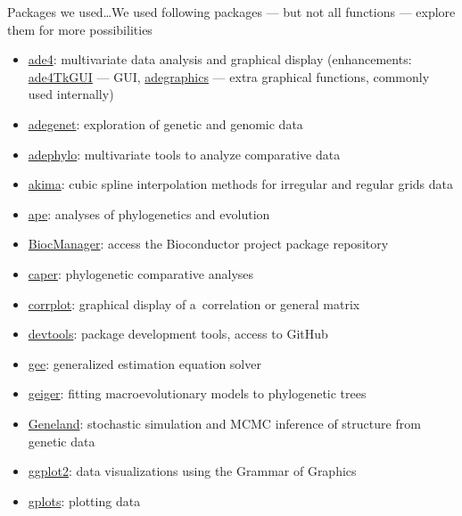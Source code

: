 \documentclass[compress, ucs, xelatex, 11pt, xcolor=svgnames,
	hyperref={
		bookmarks=true,
		unicode=true,
		colorlinks=true,
		pdftitle={Molecular data in R},
		plainpages=false,
		pdfauthor={Vojtech Zeisek},
		pdfsubject={Course about phylogeny and evolution in R},
		pdfcreator={XeLaTeX},
		pdfkeywords={R, evolution, phylogeny, molecular data},
		linkcolor=Tomato,
		anchorcolor=SaddleBrown,
		citecolor=Goldenrod,
		filecolor=DarkMagenta,
		menucolor=Sienna,
		urlcolor=DarkTurquoise,
		pdftex},
	url={hyphens, lowtilde} %
	]{beamer}
\begin{document}
\begin{frame}[allowframebreaks]{Packages we used\ldots}{We used following packages --- but not all functions --- explore them for more possibilities}
	\begin{itemize}
		\item \href{https://CRAN.R-project.org/package=ade4}{ade4}: multivariate data analysis and graphical display (enhancements: \href{https://CRAN.R-project.org/package=ade4TkGUI}{ade4TkGUI} --- GUI, \href{https://CRAN.R-project.org/package=adegraphics}{adegraphics} --- extra graphical functions, commonly used internally)
		\item \href{https://CRAN.R-project.org/package=adegenet}{adegenet}: exploration of genetic and genomic data
		\item \href{https://CRAN.R-project.org/package=adephylo}{adephylo}: multivariate tools to analyze comparative data
		\item \href{https://CRAN.R-project.org/package=akima}{akima}: cubic spline interpolation methods for irregular and regular grids data
		\item \href{https://CRAN.R-project.org/package=ape}{ape}: analyses of phylogenetics and evolution
		\item \href{https://CRAN.R-project.org/package=BiocManager}{BiocManager}: access the Bioconductor project package repository
		\item \href{https://CRAN.R-project.org/package=caper}{caper}: phylogenetic comparative analyses
		\item \href{https://CRAN.R-project.org/package=corrplot}{corrplot}: graphical display of a~correlation or general matrix
		\item \href{https://CRAN.R-project.org/package=devtools}{devtools}: package development tools, access to GitHub
		\item \href{https://CRAN.R-project.org/package=gee}{gee}: generalized estimation equation solver
		\item \href{https://CRAN.R-project.org/package=geiger}{geiger}: fitting macroevolutionary models to phylogenetic trees
		\item \href{https://i-pri.org/special/Biostatistics/Software/Geneland/}{Geneland}: stochastic simulation and MCMC inference of structure from genetic data
		\item \href{https://CRAN.R-project.org/package=ggplot2}{ggplot2}: data visualizations using the Grammar of Graphics
		\item \href{https://CRAN.R-project.org/package=gplots}{gplots}: plotting data

\end{itemize}
\end{frame}
\end{document}
